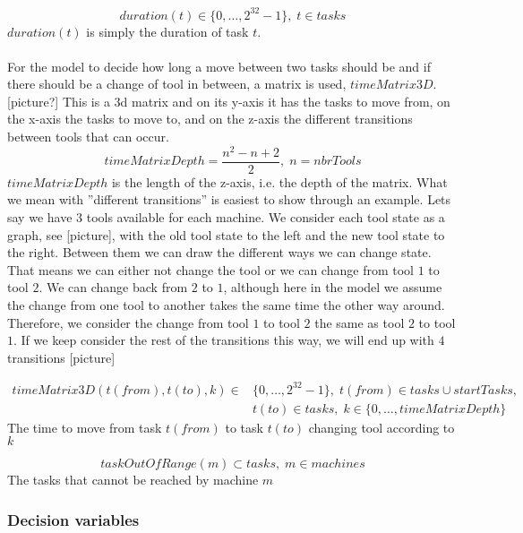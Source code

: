 \documentclass[10pt,a4paper]{report}
\begin{document}
\begin{equation}\label{eq:42}
duration(t) \in \{0 , \ldots , 2^{32}-1\}, \; t \in tasks\end{equation}
$duration(t)$ is simply the duration of task $t$.
\\\\
For the model to decide how long a move between two tasks should be and if there should be a change of tool in between, a matrix is used, $timeMatrix3D$.[picture?] This is a 3d matrix and on its y-axis it has the tasks to move from, on the x-axis the tasks to move to, and on the z-axis the different transitions between tools that can occur.
\begin{equation}\label{eq:43}
timeMatrixDepth = \frac{n^2 - n + 2}{2}, \; n = nbrTools\end{equation}
$timeMatrixDepth$ is the length of the z-axis, i.e. the depth of the matrix. What we mean with ''different transitions'' is easiest to show through an example. Lets say we have $3$ tools available for each machine. We consider each tool state as a graph, see [picture], with the old tool state to the left and the new tool state to the right. Between them we can draw the different ways we can change state. That means we can either not change the tool or we can change from tool $1$ to tool $2$. We can change back from $2$ to $1$, although here in the model we assume the change from one tool to another takes the same time the other way around. Therefore, we consider the change from tool $1$ to tool $2$ the same as tool $2$ to tool $1$. If we keep consider the rest of the transitions this way, we will end up with $4$ transitions [picture]


\begin{equation}
\begin{aligned}\label{eq:44}
timeMatrix3D(t(from),t(to),k) \in &\{0 , \ldots , 2^{32}-1\}, \; t(from) \in tasks \cup startTasks,  \\ 
&t(to) \in tasks, \; k \in \{0 , \ldots , timeMatrixDepth\}
\end{aligned}
\end{equation}
The time to move from task $t(from)$ to task $t(to)$ changing tool according to $k$

\begin{equation}\label{eq:56}
taskOutOfRange(m) \subset tasks, \; m \in machines\end{equation}
The tasks that cannot be reached by machine $m$


\subsubsection{Decision variables}
\end{document}
